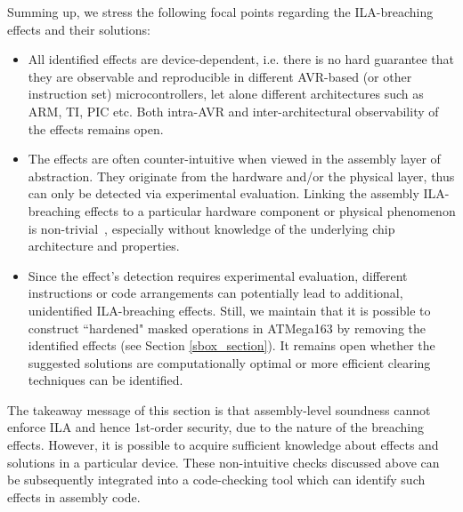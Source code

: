 Summing up, we stress the following focal points regarding the ILA-breaching effects and their solutions:
\begin{itemize}
\item All identified effects are device-dependent, i.e. there is no hard guarantee that they are observable and reproducible in different AVR-based (or other instruction set) microcontrollers, let alone different architectures such as ARM, TI, PIC etc. Both intra-AVR and inter-architectural observability of the effects remains open.
\item The effects are often counter-intuitive when viewed in the assembly layer of abstraction. They originate from the hardware and/or the physical layer, thus can only be detected via experimental evaluation. Linking the assembly ILA-breaching effects to a particular hardware component or physical phenomenon is non-trivial~\cite{renauld,others}, especially without knowledge of the underlying chip architecture and properties.
\item  Since the effect's detection requires experimental evaluation, different instructions or code arrangements can potentially lead to additional, unidentified ILA-breaching effects. Still, we maintain that it is possible to construct ``hardened" masked operations in ATMega163 by removing the identified effects (see Section \ref{sbox_section}). It remains open whether the suggested solutions are computationally optimal or more efficient clearing techniques can be identified.
\end{itemize}

The takeaway message of this section is that assembly-level soundness cannot enforce ILA and hence 1st-order security, due to the nature of the breaching effects. However, it is possible to acquire sufficient knowledge about effects and solutions in a particular device. These non-intuitive checks discussed above can be subsequently integrated into a code-checking tool which can identify such effects in assembly code.
